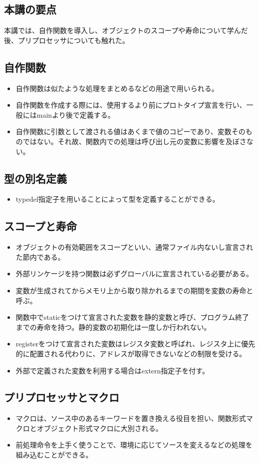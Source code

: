 \begin{shadebox}
\section*{本講の要点}
本講では、自作関数を導入し、オブジェクトのスコープや寿命について学んだ後、プリプロセッサについても触れた。
\subsection*{自作関数}
\begin{itemize}
\item 自作関数は似たような処理をまとめるなどの用途で用いられる。
\item 自作関数を作成する際には、使用するより前にプロトタイプ宣言を行い、一般にはmainより後で定義する。
\item 自作関数に引数として渡される値はあくまで値のコピーであり、変数そのものではない。それ故、関数内での処理は呼び出し元の変数に影響を及ぼさない。
\end{itemize}

\subsection*{型の別名定義}
\begin{itemize}
\item typedef指定子を用いることによって型を定義することができる。
\end{itemize}

\subsection*{スコープと寿命}
\begin{itemize}
\item オブジェクトの有効範囲をスコープといい、通常ファイル内ないし宣言された節内である。
\item 外部リンケージを持つ関数は必ずグローバルに宣言されている必要がある。
\item 変数が生成されてからメモリ上から取り除かれるまでの期間を変数の寿命と呼ぶ。
\item 関数中でstaticをつけて宣言された変数を静的変数と呼び、プログラム終了までの寿命を持つ。静的変数の初期化は一度しか行われない。
\item registerをつけて宣言された変数はレジスタ変数と呼ばれ、レジスタ上に優先的に配置される代わりに、アドレスが取得できないなどの制限を受ける。
\item 外部で定義された変数を利用する場合はextern指定子を付す。
\end{itemize}

\subsection*{プリプロセッサとマクロ}
\begin{itemize}
\item マクロは、ソース中のあるキーワードを置き換える役目を担い、関数形式マクロとオブジェクト形式マクロに大別される。
\item 前処理命令を上手く使うことで、環境に応じてソースを変えるなどの処理を組み込むことができる。
\end{itemize}
\end{shadebox}

